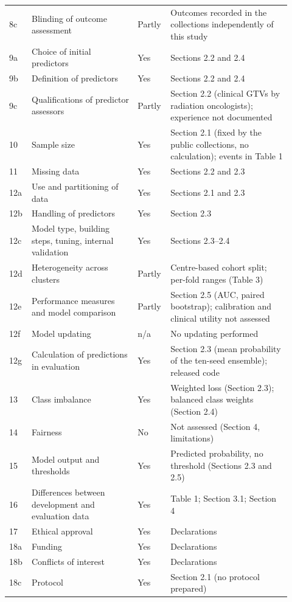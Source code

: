 \begin{longtable}{@{}L{0.06\linewidth}L{0.36\linewidth}L{0.08\linewidth}L{0.415\linewidth}@{}}
8c & Blinding of outcome assessment & Partly & Outcomes recorded in the collections independently of this study \\
9a & Choice of initial predictors & Yes & Sections 2.2 and 2.4 \\
9b & Definition of predictors & Yes & Sections 2.2 and 2.4 \\
9c & Qualifications of predictor assessors & Partly & Section 2.2 (clinical GTVs by radiation oncologists); experience not documented \\
10 & Sample size & Yes & Section 2.1 (fixed by the public collections, no calculation); events in Table 1 \\
11 & Missing data & Yes & Sections 2.2 and 2.3 \\
12a & Use and partitioning of data & Yes & Sections 2.1 and 2.3 \\
12b & Handling of predictors & Yes & Section 2.3 \\
12c & Model type, building steps, tuning, internal validation & Yes & Sections 2.3--2.4 \\
12d & Heterogeneity across clusters & Partly & Centre-based cohort split; per-fold ranges (Table 3) \\
12e & Performance measures and model comparison & Partly & Section 2.5 (AUC, paired bootstrap); calibration and clinical utility not assessed \\
12f & Model updating & n/a & No updating performed \\
12g & Calculation of predictions in evaluation & Yes & Section 2.3 (mean probability of the ten-seed ensemble); released code \\
13 & Class imbalance & Yes & Weighted loss (Section 2.3); balanced class weights (Section 2.4) \\
14 & Fairness & No & Not assessed (Section 4, limitations) \\
15 & Model output and thresholds & Yes & Predicted probability, no threshold (Sections 2.3 and 2.5) \\
16 & Differences between development and evaluation data & Yes & Table 1; Section 3.1; Section 4 \\
17 & Ethical approval & Yes & Declarations \\
18a & Funding & Yes & Declarations \\
18b & Conflicts of interest & Yes & Declarations \\
18c & Protocol & Yes & Section 2.1 (no protocol prepared) \\

\end{longtable}
